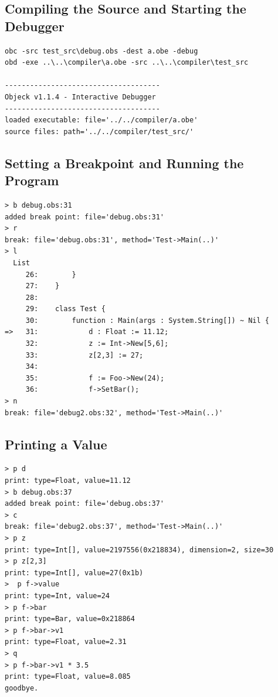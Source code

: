 \documentclass[12pt]{article}
\begin{document}
\subsection{Compiling the Source and Starting the Debugger}
\begin{verbatim}
obc -src test_src\debug.obs -dest a.obe -debug
obd -exe ..\..\compiler\a.obe -src ..\..\compiler\test_src

-------------------------------------
Objeck v1.1.4 - Interactive Debugger
-------------------------------------
loaded executable: file='../../compiler/a.obe'
source files: path='../../compiler/test_src/'
\end{verbatim}

\subsection{Setting a Breakpoint and Running the Program}
\begin{verbatim}
> b debug.obs:31
added break point: file='debug.obs:31'
> r
break: file='debug.obs:31', method='Test->Main(..)'
> l
  List
     26: 		}
     27: 	}
     28: 
     29: 	class Test {
     30: 		function : Main(args : System.String[]) ~ Nil {
=>   31: 			d : Float := 11.12;
     32: 			z := Int->New[5,6];	
     33: 			z[2,3] := 27;
     34: 
     35: 			f := Foo->New(24);
     36: 			f->SetBar();
> n
break: file='debug2.obs:32', method='Test->Main(..)'
\end{verbatim}

\subsection{Printing a Value}
\begin{verbatim}
> p d
print: type=Float, value=11.12
> b debug.obs:37
added break point: file='debug.obs:37'
> c
break: file='debug2.obs:37', method='Test->Main(..)'
> p z
print: type=Int[], value=2197556(0x218834), dimension=2, size=30
> p z[2,3]
print: type=Int[], value=27(0x1b)
>  p f->value
print: type=Int, value=24
> p f->bar
print: type=Bar, value=0x218864
> p f->bar->v1
print: type=Float, value=2.31
> q
> p f->bar->v1 * 3.5
print: type=Float, value=8.085
goodbye.
\end{verbatim}
\end{document}
